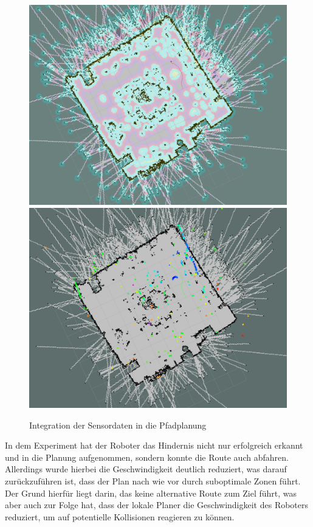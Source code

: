 \begin{figure}[!ht]
\centering
\includegraphics[width=0.45\linewidth ,trim={13cm 11cm 9cm 2cm},clip]{img/Experiment2_Global_Plan_Hindernis.png}
\includegraphics[width=0.45\linewidth ,trim={13cm 11cm 9cm 2cm},clip]{img/Experiment2_Global_Plan_Lascerscan_Hindernis.png}
\caption{Integration der Sensordaten in die Pfadplanung}
\end{figure}

In dem Experiment hat der Roboter das Hindernis nicht nur erfolgreich erkannt und in die Planung aufgenommen, sondern konnte die Route auch abfahren. Allerdings wurde hierbei die Geschwindigkeit deutlich reduziert, was darauf zurückzuführen ist, dass der Plan nach wie vor durch suboptimale Zonen führt. Der Grund hierfür liegt darin, das keine alternative Route zum Ziel führt, was aber auch zur Folge hat, dass der lokale Planer die Geschwindigkeit des Roboters reduziert, um auf potentielle Kollisionen reagieren zu können.